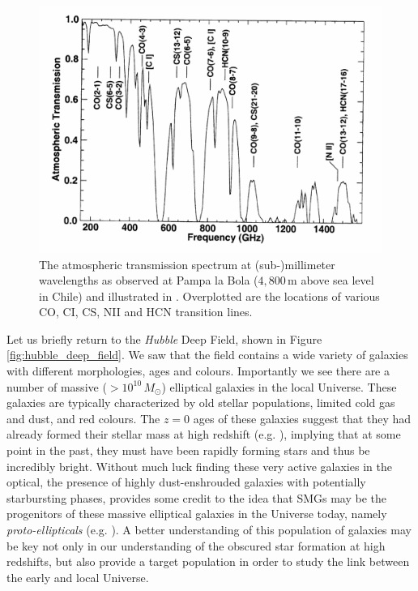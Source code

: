 \begin{figure}
    \centering
	\includegraphics[angle=0.8, origin=c, width=0.8\columnwidth]{Figures/transmission.pdf}
	\caption[Atmospheric transmission of (sub-) mm wavelengths from Pampa la Bola]{The atmospheric transmission spectrum at (sub-)millimeter wavelengths as observed at Pampa la Bola ($4,800\,$m above sea level in Chile) and illustrated in \citealt{Matsushita_2000}. Overplotted are the locations of various CO, CI, CS, NII and HCN transition lines.}
	\label{fig:transmission}
\end{figure}

Let us briefly return to the \textit{Hubble} Deep Field, shown in Figure \ref{fig:hubble_deep_field}. We saw that the field contains a wide variety of galaxies with different morphologies, ages and colours. Importantly we see there are a number of massive ($>10^{10}\,M_\odot$) elliptical galaxies in the local Universe. These galaxies are typically characterized by old stellar populations, limited cold gas and dust, and red colours. The $z = 0$ ages of these galaxies suggest that they had already formed their stellar mass at high redshift (e.g. \citealt{Gallazzi_2005, Thomas_2005}), implying that at some point in the past, they must have been rapidly forming stars and thus be incredibly bright. Without much luck finding these very active galaxies in the optical, the presence of highly dust-enshrouded galaxies with potentially starbursting phases, provides some credit to the idea that SMGs may be the progenitors of these massive elliptical galaxies in the Universe today, namely \textit{proto-ellipticals} (e.g. \citealt{Toft_2014, Valentino_2020b}). A better understanding of this population of galaxies may be key not only in our understanding of the obscured star formation at high redshifts, but also provide a target population in order to study the link between the early and local Universe.

